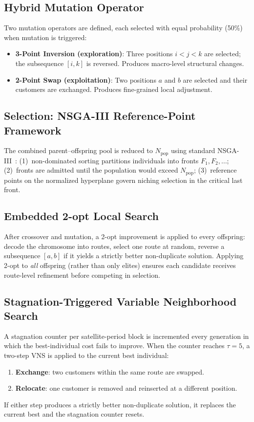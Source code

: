 \documentclass[11pt, a4paper]{article}
\numberwithin{equation}{section}
\begin{document}
\subsection{Hybrid Mutation Operator}

Two mutation operators are defined, each selected with equal probability (50\%)
when mutation is triggered:
\begin{itemize}
  \item \textbf{3-Point Inversion (exploration)}: Three positions $i<j<k$ are
        selected; the subsequence $[i,k]$ is reversed.  Produces macro-level
        structural changes.
  \item \textbf{2-Point Swap (exploitation)}: Two positions $a$ and $b$ are
        selected and their customers are exchanged.  Produces fine-grained
        local adjustment.
\end{itemize}

\subsection{Selection: NSGA-III Reference-Point Framework}

The combined parent--offspring pool is reduced to $N_{\mathrm{pop}}$ using
standard NSGA-III~\cite{deb2014nsga3}: (1)~non-dominated sorting partitions
individuals into fronts $F_1,F_2,\ldots$; (2)~fronts are admitted until the
population would exceed $N_{\mathrm{pop}}$; (3)~reference points on the
normalized hyperplane govern niching selection in the critical last front.

\subsection{Embedded 2-opt Local Search}

After crossover and mutation, a 2-opt improvement is applied to every
offspring: decode the chromosome into routes, select one route at random,
reverse a subsequence $[a,b]$ if it yields a strictly better non-duplicate
solution.  Applying 2-opt to \emph{all} offspring (rather than only elites)
ensures each candidate receives route-level refinement before competing in
selection.

\subsection{Stagnation-Triggered Variable Neighborhood Search}
\label{sec:vns}

A stagnation counter per satellite-period block is incremented every
generation in which the best-individual cost fails to improve.  When the counter reaches
$\tau=5$, a two-step VNS is applied to the current best individual:
\begin{enumerate}
  \item \textbf{Exchange}: two customers within the same route are swapped.
  \item \textbf{Relocate}: one customer is removed and reinserted at a
        different position.
\end{enumerate}
If either step produces a strictly better non-duplicate solution, it replaces
the current best and the stagnation counter resets.
\end{document}
